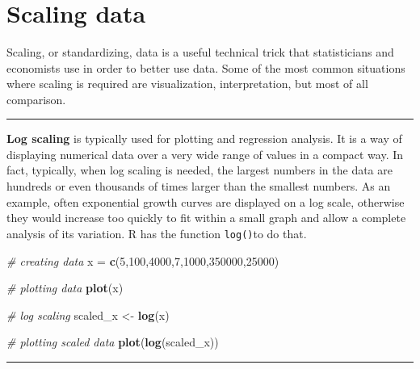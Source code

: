\documentclass[
]{svmono}
\newenvironment{Shaded}{\begin{snugshade}}{\end{snugshade}}
\newcommand{\CommentTok}[1]{\textcolor[rgb]{0.56,0.35,0.01}{\textit{#1}}}
\newcommand{\DecValTok}[1]{\textcolor[rgb]{0.00,0.00,0.81}{#1}}
\newcommand{\FunctionTok}[1]{\textcolor[rgb]{0.13,0.29,0.53}{\textbf{#1}}}
\newcommand{\NormalTok}[1]{#1}
\newcommand{\OtherTok}[1]{\textcolor[rgb]{0.56,0.35,0.01}{#1}}
\begin{document}
~

~

~

\hypertarget{scaling-data}{%
\section{Scaling data}\label{scaling-data}}

Scaling, or standardizing, data is a useful technical trick that
statisticians and economists use in order to better use data. Some of
the most common situations where scaling is required are visualization,
interpretation, but most of all comparison.

\begin{center}\rule{0.5\linewidth}{0.5pt}\end{center}

\textbf{Log scaling} is typically used for plotting and regression analysis.
It is a way of displaying numerical data over a very wide range of
values in a compact way. In fact, typically, when log scaling is needed,
the largest numbers in the data are hundreds or even thousands of times
larger than the smallest numbers. As an example, often exponential
growth curves are displayed on a log scale, otherwise they would
increase too quickly to fit within a small graph and allow a complete
analysis of its variation. R has the function \texttt{log()}to do that.

\begin{Shaded}
\begin{Highlighting}[]
\CommentTok{\# creating data}
\NormalTok{x }\OtherTok{=} \FunctionTok{c}\NormalTok{(}\DecValTok{5}\NormalTok{,}\DecValTok{100}\NormalTok{,}\DecValTok{4000}\NormalTok{,}\DecValTok{7}\NormalTok{,}\DecValTok{1000}\NormalTok{,}\DecValTok{350000}\NormalTok{,}\DecValTok{25000}\NormalTok{)}

\CommentTok{\# plotting data}
\FunctionTok{plot}\NormalTok{(x)}

\CommentTok{\# log scaling}
\NormalTok{scaled\_x }\OtherTok{\textless{}{-}} \FunctionTok{log}\NormalTok{(x)}

\CommentTok{\# plotting scaled data}
\FunctionTok{plot}\NormalTok{(}\FunctionTok{log}\NormalTok{(scaled\_x))}
\end{Highlighting}
\end{Shaded}

\begin{center}\rule{0.5\linewidth}{0.5pt}\end{center}
\end{document}
